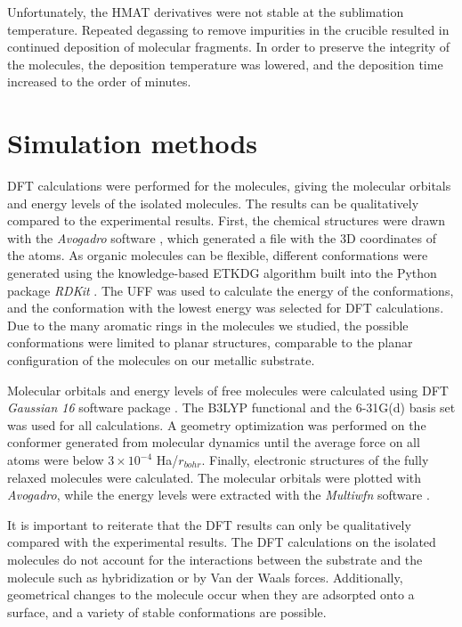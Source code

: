 Unfortunately, the \ac{HMAT} derivatives were not stable at the sublimation temperature. Repeated degassing to remove impurities in the crucible resulted in continued deposition of molecular fragments. In order to preserve the integrity of the molecules, the deposition temperature was lowered, and the deposition time increased to the order of minutes.













\section{Simulation methods}

\Acf{DFT} calculations were performed for the molecules, giving the molecular orbitals and energy levels of the isolated molecules. The results can be qualitatively compared to the experimental results. First, the chemical structures were drawn with the \textit{Avogadro} software \citep{hanwell2012avogadro}, which generated a file with the \ac{3D} coordinates of the atoms. As organic molecules can be flexible, different conformations were generated using the knowledge-based \ac{ETKDG} algorithm \citep{riniker2015better} built into the Python package \textit{RDKit} \citep{rdkit}. The \ac{UFF} \citep{rappe1992uff} was used to calculate the energy of the conformations, and the conformation with the lowest energy was selected for \ac{DFT} calculations. Due to the many aromatic rings in the molecules we studied, the possible conformations were limited to planar structures, comparable to the planar configuration of the molecules on our metallic substrate.

Molecular orbitals and energy levels of free molecules were calculated using \ac{DFT} \emph{Gaussian 16} software package \citep{frisch2016gaussian}. The \ac{B3LYP} functional \citep{lee1988development,becke1993becke} and the 6-31G(d) \citep{frisch1984self} basis set was used for all calculations. A geometry optimization was performed on the conformer generated from molecular dynamics until the average force on all atoms were below $3\times 10^{-4}$ Ha/$r_{bohr}$. Finally, electronic structures of the fully relaxed molecules were calculated. The molecular orbitals were plotted with \textit{Avogadro}, while the energy levels were extracted with the \textit{Multiwfn} software \citep{lu2012multiwfn}. 

It is important to reiterate that the \ac{DFT} results can only be qualitatively compared with the experimental results. The \ac{DFT} calculations on the isolated molecules do not account for the interactions between the substrate and the molecule such as hybridization or by Van der Waals forces. Additionally, geometrical changes to the molecule occur when they are adsorpted onto a surface, and a variety of stable conformations are possible.

